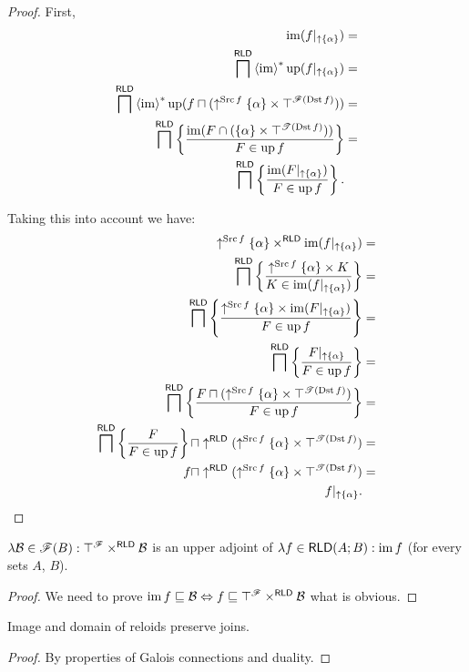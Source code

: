 \begin{proof}
First,
\begin{align*}
\operatorname{im}(f|_{\uparrow \{\alpha\}}) & =\\
\bigsqcap^{\mathsf{RLD}}\left\langle \operatorname{im}\right\rangle ^{\ast}\operatorname{up}(f|_{\uparrow \{\alpha\}}) & =\\
\bigsqcap^{\mathsf{RLD}}\left\langle \operatorname{im}\right\rangle ^{\ast}\operatorname{up}(f\sqcap(\uparrow^{\operatorname{Src} f}\{\alpha\}\times\top^{\mathscr{F}(\operatorname{Dst} f)})) & =\\
\bigsqcap^{\mathsf{RLD}}\left\{ \frac{\operatorname{im}(F\cap(\{\alpha\}\times\top^{\mathscr{T}(\operatorname{Dst} f)}))}{F\in\operatorname{up} f}\right\} & =\\
\bigsqcap^{\mathsf{RLD}}\left\{ \frac{\operatorname{im}(F|_{\uparrow \{\alpha\}})}{F\in\operatorname{up} f}\right\}.
\end{align*}


Taking this into account we have:
\begin{align*}
\uparrow^{\operatorname{Src} f}\{\alpha\}\times^{\mathsf{RLD}}\operatorname{im}(f|_{\uparrow \{\alpha\}}) & =\\
\bigsqcap^{\mathsf{RLD}}\left\{ \frac{\uparrow^{\operatorname{Src} f}\{\alpha\}\times K}{K\in\operatorname{im}(f|_{\uparrow \{\alpha\}})}\right\} & =\\
\bigsqcap^{\mathsf{RLD}}\left\{ \frac{\uparrow^{\operatorname{Src} f}\{\alpha\}\times\operatorname{im}(F|_{\uparrow \{\alpha\}})}{F\in\operatorname{up} f}\right\} & =\\
\bigsqcap^{\mathsf{RLD}}\left\{ \frac{F|_{\uparrow \{\alpha\}}}{F\in\operatorname{up} f}\right\} & =\\
\bigsqcap^{\mathsf{RLD}}\left\{ \frac{F\sqcap(\uparrow^{\operatorname{Src} f}\{\alpha\}\times\top^{\mathscr{T}(\operatorname{Dst} f)})}{F\in\operatorname{up} f}\right\} & =\\
\bigsqcap^{\mathsf{RLD}}\left\{ \frac{F}{F\in\operatorname{up} f}\right\}\sqcap\uparrow^{\mathsf{RLD}}(\uparrow^{\operatorname{Src} f}\{\alpha\}\times\top^{\mathscr{T}(\operatorname{Dst} f)}) & =\\
f\sqcap\uparrow^{\mathsf{RLD}}(\uparrow^{\operatorname{Src} f}\{\alpha\}\times\top^{\mathscr{T}(\operatorname{Dst} f)}) & =\\
f|_{\uparrow \{\alpha\}}.
\end{align*}
\end{proof}
\begin{lem}
$\lambda\mathcal{B}\in\mathscr{F}(B):\top^{\mathscr{F}}\times^{\mathsf{RLD}}\mathcal{B}$
is an upper adjoint of $\lambda f\in\mathsf{RLD}(A;B):\operatorname{im} f$ (for
every sets $A$, $B$).\end{lem}
\begin{proof}
We need to prove $\operatorname{im} f\sqsubseteq\mathcal{B}\Leftrightarrow f\sqsubseteq\top^{\mathscr{F}}\times^{\mathsf{RLD}}\mathcal{B}$
what is obvious.\end{proof}
\begin{cor}
\label{rld-dom-join}Image and domain of reloids preserve joins.\end{cor}
\begin{proof}
By properties of Galois connections and duality.
\end{proof}

